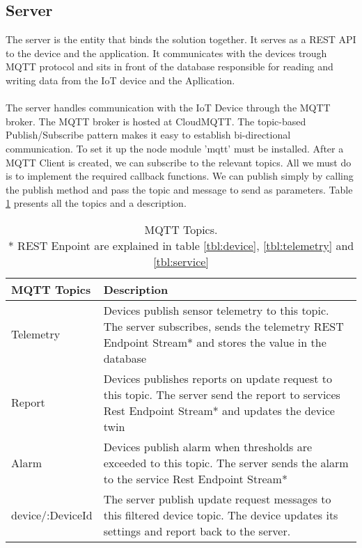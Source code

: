 \subsection{Server}
The server is the entity that binds the solution together. It serves as a REST API to the device and the application. It communicates with the devices trough MQTT protocol and sits in front of the database responsible for reading and writing data from the IoT device and the Apllication. \\\\ The server handles communication with the IoT Device through the MQTT broker. The MQTT broker is hosted at CloudMQTT. The topic-based Publish/Subscribe pattern makes it easy to establish bi-directional communication. To set it up the node module 'mqtt' must be installed. After a MQTT Client is created, we can subscribe to the relevant topics. All we must do is to implement the required callback functions. We can publish simply by calling the publish method and pass the topic and message to send as parameters. Table \ref{tbl:topics} presents all the topics and a description.

\begin{table}[H]
    \centering
    \begin{tabular}{|l|p{10cm}|}
    \hline
    \textbf{MQTT Topics}    & \textbf{Description} \\ \hline
    Telemetry & Devices publish sensor telemetry to this topic. The server subscribes, sends the telemetry REST Endpoint Stream* and stores the value in the database \\ \hline
    Report & Devices publishes reports on update request to this topic. The server send the report to services Rest Endpoint Stream* and updates the device twin \\ \hline
    Alarm & Devices publish alarm when thresholds are exceeded to this topic. The server sends the alarm to the service Rest Endpoint Stream* \\ \hline
    device/:DeviceId & The server publish update request messages to this filtered device topic. The device updates its settings and report back to the server. \\ \hline
    \end{tabular}
    \caption{MQTT Topics.\\ * REST Enpoint are explained in table \ref{tbl:device}, \ref{tbl:telemetry} and \ref{tbl:service}}
    \label{tbl:topics}
\end{table}

